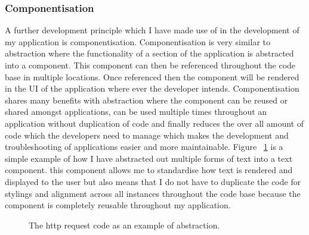 \documentclass[a4paper,11pt]{report}
\begin{document}
\subsubsection{Componentisation}
A further development principle which I have made use of in the development of my application is componentisation. Componentisation is very similar to abstraction where the functionality of a section of the application is abstracted into a component. This component can then be referenced throughout the code base in multiple locations. Once referenced then the component will be rendered in the UI of the application where ever the developer intends. Componentisation shares many benefits with abstraction where the component can be reused or shared amongst applications, can be used multiple times throughout an application without duplication of code and finally reduces the over all amount of code which the developers need to manage which makes the development and troubleshooting of applications easier and more maintainable. 
Figure ~\ref{fig:textComponent} is a simple example of how I have abstracted out multiple forms of text into a text component. this component allows me to standardise how text is rendered and displayed to the user but also means that I do not have to duplicate the code for stylings and alignment across all instances throughout the code base because the component is completely reusable throughout my application.

\begin{figure}[H]
    \centering
    \caption{The http request code as an example of abstraction.}
    \label{fig:textComponent}
    \end{figure}
\end{document}
